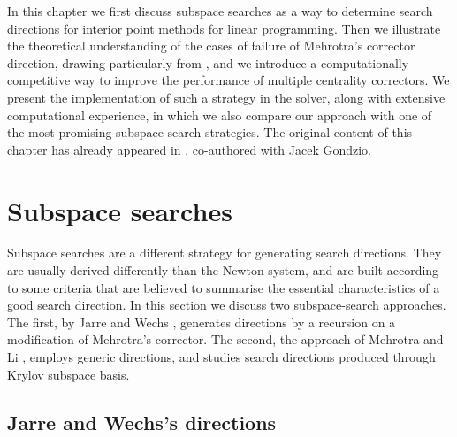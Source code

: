 
%
%
\label{ch:Correctors}

In this chapter we first discuss subspace searches as a way 
to determine search directions for interior point methods
for linear programming.
Then we illustrate the theoretical understanding of 
the cases of failure of Mehrotra's corrector direction,
drawing particularly from \cite{Cartis04,Cartis05}, 
and we introduce a computationally competitive way
to improve the performance of multiple centrality correctors.
We present the implementation of such a strategy in the \HOPDM solver,
along with extensive computational experience, in which
we also compare our approach with one of the most promising
subspace-search strategies.
The original content of this chapter has already appeared 
in \cite{ColomboGondzio05}, co-authored with Jacek Gondzio.


%
%
\section{Subspace searches}
\label{sec:SubspaceSearches}

Subspace searches are a different strategy for generating search 
directions. 
They are usually derived differently than the Newton system, and 
are built according to some criteria that are believed to summarise
the essential characteristics of a good search direction.
In this section we discuss two subspace-search approaches. 
The first, by Jarre and Wechs \cite{JarreWechs}, generates directions
by a recursion on a modification of Mehrotra's corrector.
The second, the approach of Mehrotra and Li \cite{MehrotraLi},
employs generic directions, and studies search directions
produced through Krylov subspace basis.

%
%
\subsection{Jarre and Wechs's directions}
\label{sec:JarreWechs}

